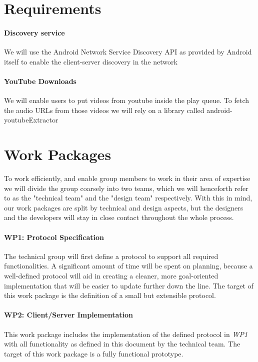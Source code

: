 \documentclass{report}
\begin{document}
\section{Requirements}

	\paragraph{Discovery service}
	We will use the Android Network Service Discovery API \cite{nsd} as provided by Android itself
	to enable the client-server discovery in the network
	
	\paragraph{YouTube Downloads}
	We will enable users to put videos from youtube inside the play queue. To fetch the audio
	URLs from those videos we will rely on a library called android-youtubeExtractor \cite{youtubeExtractor}
\newpage
\section{Work Packages}
To work efficiently, and enable group members to work in their area of expertise
we will divide the group coarsely into two teams, which we will henceforth refer to 
as the "technical team" and the "design team" respectively.
With this in mind, our work packages are split by technical and design aspects, but 
the designers and the developers will stay in close contact throughout the whole process.

\paragraph{WP1: Protocol Specification}
The technical group will first define a protocol to support all required functionalities.
A significant amount of time will be spent on planning, because a well-defined protocol will 
aid in creating a cleaner, more goal-oriented implementation that will be easier to update 
further down the line. The target of this work package is the definition of a small but extensible protocol.

\paragraph{WP2: Client/Server Implementation}
This work package includes the implementation of the defined protocol in \emph{WP1}
with all functionality as defined in this document by the technical team. The target of this 
work package is a fully functional prototype.
\end{document}

